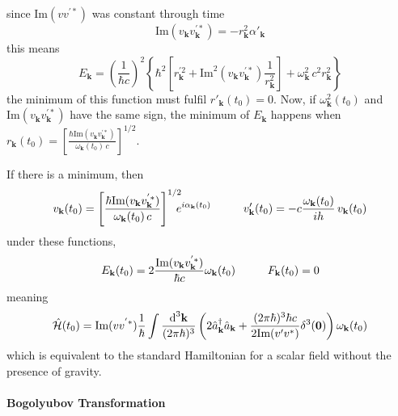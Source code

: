 since Im$(vv^{'*})$ was constant through time
\begin{equation}
	\text{Im}(v_\mathbf{k}v^{'*}_\mathbf{k})=-r_\mathbf{k}^2\alpha'_\mathbf{k}
\end{equation}
this means
\begin{equation}
	E_\mathbf{k}=\left(\frac{1}{\hbar c}\right)^2\left\{\hbar^2\left[r^{'2}_\mathbf{k}+\text{Im}^2\left(v_\mathbf{k}v^{'*}_\mathbf{k}\right)\frac{1}{r_\mathbf{k}^2}\right]+\omega^2_\mathbf{k}\,c^2r_\mathbf{k}^2\right\}
\end{equation}
the minimum of this function must fulfil $r'_\mathbf{k}(t_0)=0$. Now, if $\omega_\mathbf{k}^2(t_0)$ and $\text{Im}(v_\mathbf{k}v^{'*}_\mathbf{k})$ have the same sign, the minimum of $E_\mathbf{k}$ happens when $r_\mathbf{k}(t_0)=\left[\frac{\hbar\text{Im}(v_\mathbf{k}v^{'*}_\mathbf{k})}{\omega_\mathbf{k}(t_0)\,c}\right]^{1/2}$.

If there is a minimum, then
\begin{equation}
	v_\mathbf{k}(t_0)=\left[\frac{\hbar\text{Im}(v_\mathbf{k}v^{'*}_\mathbf{k})}{\omega_\mathbf{k}(t_0)\,c}\right]^{1/2}\!\!\!\!e^{i\alpha_\mathbf{k}(t_0)}\hspace{1.0cm}v'_\mathbf{k}(t_0)=-c\frac{\omega_\mathbf{k}(t_0)}{ih}\,v_\mathbf{k}(t_0)
\end{equation}
under these functions,
\begin{equation}
	E_\mathbf{k}(t_0)=2\frac{\text{Im}(v_\mathbf{k}v^{'*}_\mathbf{k})}{\hbar c}\omega_\mathbf{k}(t_0)\hspace{1.0cm}F_\mathbf{k}(t_0)=0
\end{equation}
meaning
\begin{equation}
	\hat{\mathcal{H}}(t_0)=\text{Im}(vv^{'*})\frac{1}{\hbar}\int\frac{\text{d}^3\mathbf{k}}{(2\pi\hbar)^3}\left(2\hat{a}_\mathbf{k}^\dagger\hat{a}_\mathbf{k}+\frac{(2\pi\hbar)^3\hbar c}{2\text{Im}(v'v^*)}\delta^3(\mathbf{0})\right)\omega_\mathbf{k}(t_0)
\end{equation}
which is equivalent to the standard Hamiltonian for a scalar field without the presence of gravity.
\paragraph{Bogolyubov Transformation}

